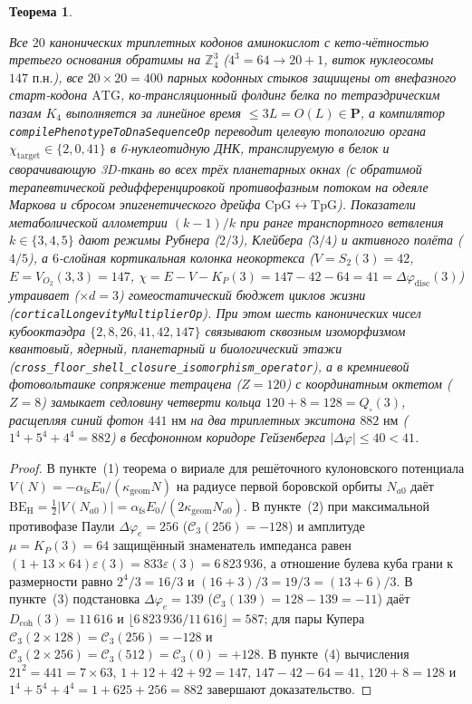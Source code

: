 \documentclass[11pt,a4paper]{article}
\theoremstyle{plain}
\newtheorem{theorem}{Теорема}[section]
\theoremstyle{definition}
\begin{document}
\begin{theorem}
\begin{enumerate}[label=\textbf{(\arabic*)},leftmargin=*]
  Все $20$ канонических триплетных кодонов аминокислот с кето-чётностью третьего основания обратимы на $\mathbb{Z}_4^3$ ($4^3 = 64 \to 20 + 1$, виток нуклеосомы $147\text{ п.н.}$), все $20\times 20 = 400$ парных кодонных стыков защищены от внефазного старт-кодона $\mathrm{ATG}$, ко-трансляционный фолдинг белка по тетраэдрическим пазам $K_4$ выполняется за линейное время $\le 3L = O(L) \in \mathbf{P}$, а компилятор \texttt{compilePhenotypeToDnaSequenceOp} переводит целевую топологию органа $\chi_{\mathrm{target}} \in \{2, 0, 41\}$ в 6-нуклеотидную ДНК, транслируемую в белок и сворачивающую 3D-ткань во всех трёх планетарных окнах (с обратимой терапевтической редифференцировкой противофазным потоком на одеяле Маркова и сбросом эпигенетического дрейфа $\mathrm{CpG} \leftrightarrow \mathrm{TpG}$). Показатели метаболической аллометрии $(k - 1)/k$ при ранге транспортного ветвления $k \in \{3, 4, 5\}$ дают режимы Рубнера ($2/3$), Клейбера ($3/4$) и активного полёта ($4/5$), а $6$-слойная кортикальная колонка неокортекса ($V = S_2(3) = 42$, $E = V_{O_2}(3,3) = 147$, $\chi = E - V - K_P(3) = 147 - 42 - 64 = 41 = \Delta\varphi_{\mathrm{disc}}(3)$) утраивает ($\times d = 3$) гомеостатический бюджет циклов жизни (\texttt{corticalLongevityMultiplierOp}). При этом шесть канонических чисел кубооктаэдра $\{2, 8, 26, 41, 42, 147\}$ связывают сквозным изоморфизмом квантовый, ядерный, планетарный и биологический этажи (\texttt{cross\_floor\_shell\_closure\_isomorphism\_operator}), а в кремниевой фотовольтаике сопряжение тетрацена ($Z = 120$) с координатным октетом ($Z = 8$) замыкает седловину четверти кольца $120 + 8 = 128 = Q_\square(3)$, расщепляя синий фотон $441\text{ нм}$ на два триплетных экситона $882\text{ нм}$ ($1^4 + 5^4 + 4^4 = 882$) в бесфононном коридоре Гейзенберга $|\Delta\varphi| \le 40 < 41$.
\end{enumerate}
\end{theorem}

\begin{proof}
В пункте~(1) теорема о вириале для решёточного кулоновского потенциала $V(N) = -\alpha_{\mathrm{fs}} E_0 / (\kappa_{\mathrm{geom}} N)$ на радиусе первой боровской орбиты $N_{a0}$ даёт $\mathrm{BE}_{\mathrm{H}} = \frac{1}{2}|V(N_{a0})| = \alpha_{\mathrm{fs}} E_0 / (2\kappa_{\mathrm{geom}} N_{a0})$. В пункте~(2) при максимальной противофазе Паули $\Delta\varphi_e = 256$ ($\mathcal{C}_3(256) = -128$) и амплитуде $\mu = K_P(3) = 64$ защищённый знаменатель импеданса равен $(1 + 13\times 64)\varepsilon(3) = 833\varepsilon(3) = 6\,823\,936$, а отношение булева куба грани к размерности равно $2^4 / 3 = 16/3$ и $(16 + 3)/3 = 19/3 = (13 + 6)/3$. В пункте~(3) подстановка $\Delta\varphi_e = 139$ ($\mathcal{C}_3(139) = 128 - 139 = -11$) даёт $D_{\mathrm{coh}}(3) = 11\,616$ и $\lfloor 6\,823\,936 / 11\,616\rfloor = 587$; для пары Купера $\mathcal{C}_3(2\times 128) = \mathcal{C}_3(256) = -128$ и $\mathcal{C}_3(2\times 256) = \mathcal{C}_3(512) = \mathcal{C}_3(0) = +128$. В пункте~(4) вычисления $21^2 = 441 = 7\times 63$, $1 + 12 + 42 + 92 = 147$, $147 - 42 - 64 = 41$, $120 + 8 = 128$ и $1^4 + 5^4 + 4^4 = 1 + 625 + 256 = 882$ завершают доказательство.
\end{proof}
\end{document}
